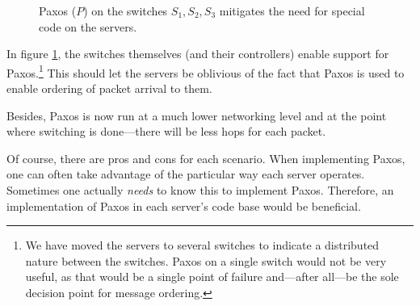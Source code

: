 \begin{figure}[H]
  \centering
  \caption{Paxos ($P$) on the switches $S_1, S_2, S_3$ mitigates the need for special code on the servers.}
  \label{figure:paxos.on.switches}
\end{figure}

In figure \ref{figure:paxos.on.switches}, the switches themselves (and their
controllers) enable
support for Paxos.\footnote{We have moved the servers to several switches
to indicate a distributed nature between the switches.
Paxos on a single switch would not be very useful, as that would be a single
point of failure and---after all---be the sole decision point for message
ordering.}
This should let the servers be oblivious of the fact that Paxos is used to
enable ordering of packet arrival to them.

Besides, Paxos is now run at a much lower networking level and at the point
where switching is done---there will be less hops for each packet.

Of course, there are pros and cons for each scenario.
When implementing Paxos, one can often take advantage of
the particular way each server operates. Sometimes one actually
\textit{needs} to know this to implement Paxos.  Therefore, an
implementation of Paxos in each server's code base would be beneficial.

